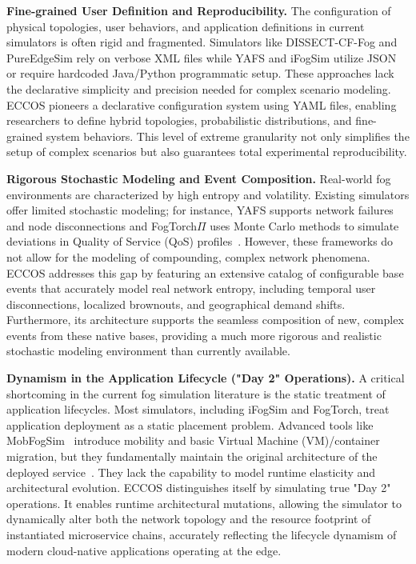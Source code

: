 \documentclass[ASNA]{USG} %
\begin{document}
\textbf{Fine-grained User Definition and Reproducibility.} The configuration of physical topologies, user behaviors, and application definitions in current simulators is often rigid and fragmented. Simulators like DISSECT-CF-Fog and PureEdgeSim rely on verbose XML files while YAFS and iFogSim utilize JSON or require hardcoded Java/Python programmatic setup. These approaches lack the declarative simplicity and precision needed for complex scenario modeling. ECCOS pioneers a declarative configuration system using YAML files, enabling researchers to define hybrid topologies, probabilistic distributions, and fine-grained system behaviors. This level of extreme granularity not only simplifies the setup of complex scenarios but also guarantees total experimental reproducibility.

\textbf{Rigorous Stochastic Modeling and Event Composition.} Real-world fog environments are characterized by high entropy and volatility. Existing simulators offer limited stochastic modeling; for instance, YAFS supports network failures and node disconnections and FogTorch$\Pi$ uses Monte Carlo methods to simulate deviations in Quality of Service (QoS) profiles~\cite{fi11030055}. However, these frameworks do not allow for the modeling of compounding, complex network phenomena. ECCOS addresses this gap by featuring an extensive catalog of configurable base events that accurately model real network entropy, including temporal user disconnections, localized brownouts, and geographical demand shifts. Furthermore, its architecture supports the seamless composition of new, complex events from these native bases, providing a much more rigorous and realistic stochastic modeling environment than currently available.

\textbf{Dynamism in the Application Lifecycle ("Day 2" Operations).} A critical shortcoming in the current fog simulation literature is the static treatment of application lifecycles. Most simulators, including iFogSim and FogTorch, treat application deployment as a static placement problem. Advanced tools like MobFogSim~\cite{PULIAFITO2020102062} introduce mobility and basic Virtual Machine (VM)/container migration, but they fundamentally maintain the original architecture of the deployed service~\cite{gupta2024simulators}. They lack the capability to model runtime elasticity and architectural evolution. ECCOS distinguishes itself by simulating true "Day 2" operations. It enables runtime architectural mutations, allowing the simulator to dynamically alter both the network topology and the resource footprint of instantiated microservice chains, accurately reflecting the lifecycle dynamism of modern cloud-native applications operating at the edge.
\end{document}
